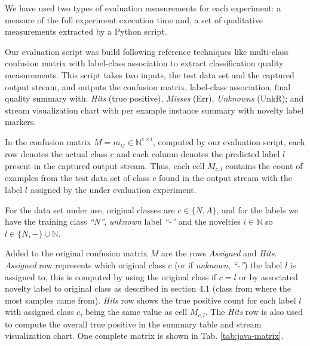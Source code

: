 We have used two types of evaluation measurements for each experiment:
a measure of the full experiment execution time
and, a set of qualitative measurements extracted by a Python script.

Our evaluation script was build following reference techniques like
multi-class confusion matrix with label-class association \cite{Faria2015minas}
to extract classification quality measurements.
This script takes two inputs, the test data set and the captured output stream,
and outputs the confusion matrix, label-class association,
final quality summary with:
\emph{Hits} (true positive), \emph{Misses} (Err), \emph{Unknowns} (UnkR); and
stream visualization chart with per example instance summary with novelty label markers.
% 

In the confusion matrix $M = m_{ij} \in \mathbb{N} ^{c \times{} l}$, computed by
our evaluation script, each row denotes %
the actual class $c$ and each column denotes the predicted label $l$ present in
the captured output stream.
Thus, each cell $M_{c, l}$ contains the count of examples from the test data set
of class $c$ found in the output stream with the label $l$ assigned by the under
evaluation experiment.

For the data set under use, original classes are $c \in \{N, A\}$, and for the
labels we have the training class
\emph{``N''}, \emph{unknown} label \emph{``-''} and the novelties $i \in
\mathbb{N}$ so $l \in \{N, -\} \cup \mathbb{N}$.

Added to the original confusion matrix $M$ are the rows \emph{Assigned} and
\emph{Hits}.
\emph{Assigned} row represents which original class $c$ (or if \emph{unknown},
\emph{``-''}) the label $l$ is assigned to, this is computed by using the
original class if $c = l$ or by associated novelty label to original class as
described in \cite{DeFaria2015evaluation} section 4.1
(class from where the most samples came from).
\emph{Hits} row shows the true positive count for each label $l$
with assigned class $c$, being the same value as cell $M_{c, l}$.
The \emph{Hits} row is also used to compute the overall true positive
in the summary table and stream visualization chart.
One complete matrix is shown in Tab. \ref{tab:java-matrix}.

